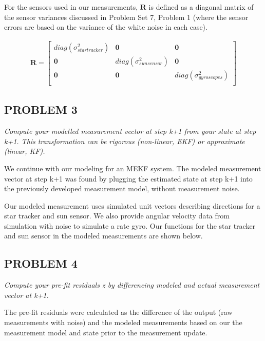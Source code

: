 For the sensors used in our measurements, $\mathbf{R}$ is defined as a diagonal matrix of the sensor variances discussed in Problem Set 7, Problem 1 (where the sensor errors are based on the variance of the white noise in each case).

\begin{align*}
    \mathbf{R} = 
    \begin{bmatrix}
        diag(\sigma_{star tracker}^2) & \mathbf{0} & \mathbf{0} \\
        \mathbf{0} & diag(\sigma_{sun sensor}^2) & \mathbf{0} \\
        \mathbf{0} & \mathbf{0} & diag(\sigma_{gyroscopes}^2)\\
    \end{bmatrix}
\end{align*}

\subsection{PROBLEM 3}
\textit{Compute your modelled measurement vector at step k+1 from your state at step k+1. 
This transformation can be rigorous (non-linear, EKF) or approximate (linear, KF).}

We continue with our modeling for an MEKF system. The modeled measurement vector at step k+1 was found by plugging the estimated state at step k+1 into the previously developed measurement model, without measurement noise.

Our modeled measurement uses simulated unit vectors describing directions for a star tracker and sun sensor. We also provide angular velocity data from simulation with noise to simulate a rate gyro. Our functions for the star tracker and sun sensor in the modeled measurements are shown below.





\subsection{PROBLEM 4}
\textit{Compute your pre-fit residuals \textit{z} by differencing modeled and actual measurement vector at k+1.}

The pre-fit residuals were calculated as the difference of the output (raw measurements with noise) and the modeled measurements based on our the measurement model and state prior to the measurement update.

